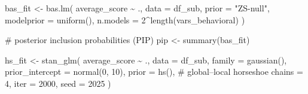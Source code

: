 \documentclass[
  letterpaper,
  DIV=11,
  numbers=noendperiod]{scrartcl}
\newenvironment{Shaded}{\begin{snugshade}}{\end{snugshade}}
\newcommand{\AttributeTok}[1]{\textcolor[rgb]{0.40,0.45,0.13}{#1}}
\newcommand{\CommentTok}[1]{\textcolor[rgb]{0.37,0.37,0.37}{#1}}
\newcommand{\DecValTok}[1]{\textcolor[rgb]{0.68,0.00,0.00}{#1}}
\newcommand{\FunctionTok}[1]{\textcolor[rgb]{0.28,0.35,0.67}{#1}}
\newcommand{\NormalTok}[1]{\textcolor[rgb]{0.00,0.23,0.31}{#1}}
\newcommand{\OtherTok}[1]{\textcolor[rgb]{0.00,0.23,0.31}{#1}}
\newcommand{\SpecialCharTok}[1]{\textcolor[rgb]{0.37,0.37,0.37}{#1}}
\newcommand{\StringTok}[1]{\textcolor[rgb]{0.13,0.47,0.30}{#1}}
\begin{document}
\begin{Shaded}
\begin{Highlighting}[]
\NormalTok{bas\_fit }\OtherTok{\textless{}{-}} \FunctionTok{bas.lm}\NormalTok{(}
\NormalTok{  average\_score }\SpecialCharTok{\textasciitilde{}}\NormalTok{ ., }
  \AttributeTok{data      =}\NormalTok{ df\_sub, }
  \AttributeTok{prior     =} \StringTok{"ZS{-}null"}\NormalTok{, }
  \AttributeTok{modelprior =} \FunctionTok{uniform}\NormalTok{(),}
  \AttributeTok{n.models  =} \DecValTok{2}\SpecialCharTok{\^{}}\FunctionTok{length}\NormalTok{(vars\_behavioral)}
\NormalTok{)}

\CommentTok{\# posterior inclusion probabilities (PIP)}
\NormalTok{pip }\OtherTok{\textless{}{-}} \FunctionTok{summary}\NormalTok{(bas\_fit)}
\end{Highlighting}
\end{Shaded}

\begin{Shaded}
\begin{Highlighting}[]
\NormalTok{hs\_fit }\OtherTok{\textless{}{-}} \FunctionTok{stan\_glm}\NormalTok{(}
\NormalTok{  average\_score }\SpecialCharTok{\textasciitilde{}}\NormalTok{ ., }
  \AttributeTok{data            =}\NormalTok{ df\_sub, }
  \AttributeTok{family          =} \FunctionTok{gaussian}\NormalTok{(),}
  \AttributeTok{prior\_intercept =} \FunctionTok{normal}\NormalTok{(}\DecValTok{0}\NormalTok{, }\DecValTok{10}\NormalTok{),}
  \AttributeTok{prior           =} \FunctionTok{hs}\NormalTok{(),     }\CommentTok{\# global–local horseshoe}
  \AttributeTok{chains          =} \DecValTok{4}\NormalTok{, }
  \AttributeTok{iter            =} \DecValTok{2000}\NormalTok{,}
  \AttributeTok{seed            =} \DecValTok{2025}
\NormalTok{)}
\end{Highlighting}
\end{Shaded}
\end{document}
